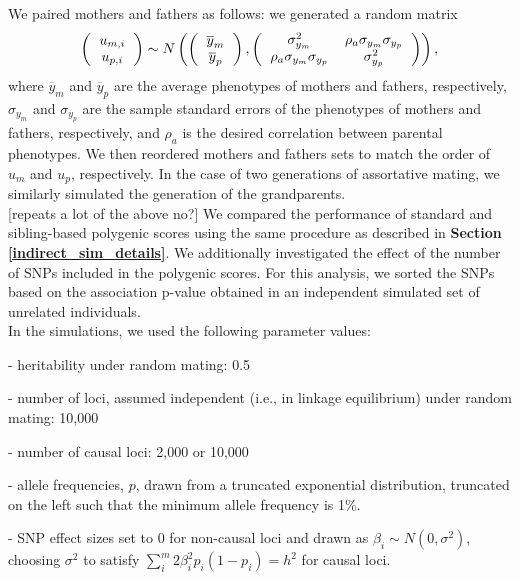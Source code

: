 \documentclass[hidelinks, 12pt]{article}
\begin{document}
We paired mothers and fathers as follows: we generated a random matrix  
\[ 
\left (
  \begin{tabular}{c}
  $u_{m,i}$ \\
  $u_{p,i}$
  \end{tabular}
\right ) \sim N
\left ( \left (
  \begin{tabular}{c}
  $\overline{y}_m$ \\
  $\overline{y}_p$
  \end{tabular}
\right ),
\left (
  \begin{tabular}{cc}
  $\sigma_{y_m}^2$ & $\rho_a \sigma_{y_m} \sigma_{y_p}$  \\
  $\rho_a \sigma_{y_m} \sigma_{y_p}$ & $\sigma_{y_p}^2$ 
  \end{tabular}
\right )\right ), 
\] where $\overline{y}_m$ and $\overline{y}_p$ are the average phenotypes of mothers and fathers, respectively, $\sigma_{y_m}$ and $\sigma_{y_p}$ are the sample standard errors of the phenotypes of mothers and fathers, respectively, and $\rho_a$ is the desired correlation between parental phenotypes.  We then reordered mothers and fathers sets to match the order of $u_m$ and $u_p$, respectively. In the case of two generations of assortative mating, we similarly simulated the generation of the grandparents.\\

[repeats a lot of the above no?] We compared the performance of standard and sibling-based polygenic scores using the same procedure as described in {\bf Section \ref{indirect_sim_details}}. We additionally investigated the effect of the number of SNPs included in the polygenic scores. For this analysis, we sorted the SNPs based on the association p-value obtained in an independent simulated set of unrelated individuals.\\ 

In the simulations, we used the following parameter values:

- heritability under random mating: 0.5

- number of loci, assumed independent (i.e., in linkage equilibrium) under random mating: 10,000

- number of causal loci: 2,000 or 10,000

- allele frequencies, $p$, drawn from a truncated exponential distribution, truncated on the left such that the minimum allele frequency is 1\%.

- SNP effect sizes set to 0 for non-causal loci and drawn as $\beta_i\sim N(0,\sigma^2)$, choosing $\sigma^2$ to satisfy $\sum_i^m2\beta_i^2p_i(1-p_i)=h^2$ for causal loci. 
\end{document}
